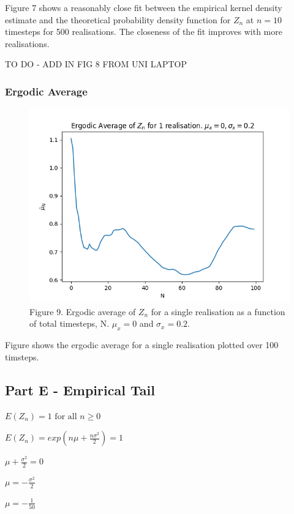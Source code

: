 \documentclass{article}
\begin{document}
Figure 7 shows a reasonably close fit between the empirical kernel density estimate and the theoretical probability density function for $Z_n$ at $n=10$ timesteps for 500 realisations. The closeness of the fit improves with more realisations.

TO DO - ADD IN FIG 8 FROM UNI LAPTOP


\subsubsection{Ergodic Average}

\begin{figure}[H]
\includegraphics[scale=0.8]{ergodic_average_a.png} 
\small{Figure 9. Ergodic average of $Z_n$ for a single realisation as a function of total timesteps, N. $\mu_x=0$ and $\sigma_x=0.2$.}
\end{figure}

Figure shows the ergodic average for a single realisation plotted over 100 timsteps. 

\subsection{Part E - Empirical Tail}

$E(Z_n) = 1 \text{ for all } n\geq0$

$E(Z_n) = exp(n\mu + \frac{n\sigma^2}{2}) = 1$

$\mu + \frac{\sigma^2}{2} = 0$

$\mu = - \frac{\sigma^2}{2}$

$\mu = -\frac{1}{50}$
\end{document}
